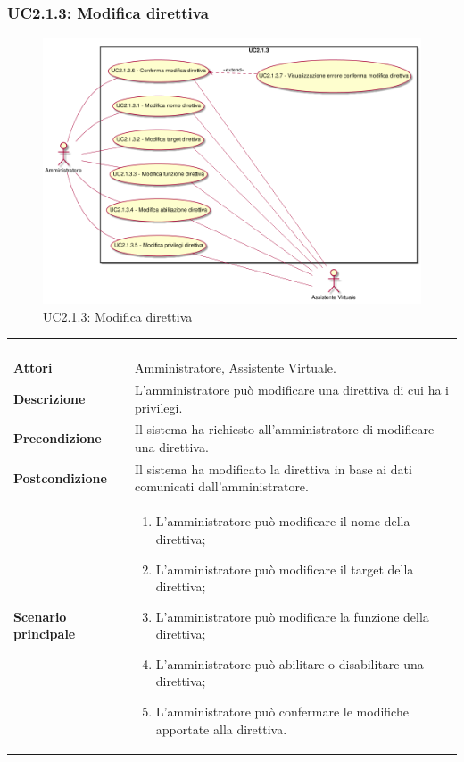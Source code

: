 \newpage\subsubsection{UC2.1.3: Modifica direttiva}
\label{UC2.1.3}
\begin{figure}[h]
\centering
\includegraphics[width=\textwidth,height=\textheight,keepaspectratio]{images/UseCaseUC213.png}
\caption{UC2.1.3: Modifica direttiva}
\end{figure}
\begin{longtable}{l|p{10cm}}
\rowcolor[gray]{0.8} \multicolumn{2}{c}{} \\
\rowcolor[gray]{0.8} \multicolumn{2}{c}{\textbf{UC2.1.3 - Modifica direttiva}} \\
\rowcolor[gray]{0.8} \multicolumn{2}{c}{} \\
\hline
&\\
\textbf{Attori} & Amministratore, Assistente Virtuale.\\[7pt]
\textbf{Descrizione} & L'amministratore può modificare una direttiva di cui ha i privilegi. \\[7pt]
\textbf{Precondizione} & Il sistema ha richiesto all'amministratore di modificare una direttiva.\\[7pt]
\textbf{Postcondizione} & Il sistema ha modificato la direttiva in base ai dati comunicati dall'amministratore.\\[7pt]
\textbf{Scenario principale} &\begin{enumerate}
\item  L'amministratore può modificare il nome della direttiva;
\item  L'amministratore può modificare il target della direttiva;
\item  L'amministratore può modificare la funzione della direttiva;
\item  L'amministratore può abilitare o disabilitare una direttiva;
\item  L'amministratore può confermare le modifiche apportate alla direttiva.
\end{enumerate}
\\[7pt]\hline
\end{longtable}

